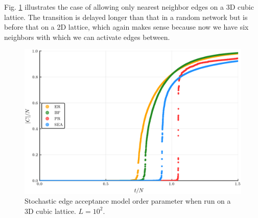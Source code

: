 Fig. \ref{fig:Lattice3D_ER_BF_PR_SEA_transition} illustrates the case of allowing only nearest neighbor edges on a 3D cubic lattice. The transition is delayed longer than that in a random network but is before that on a 2D lattice, which again makes sense because now we have six neighbors with which we can activate edges between.

\begin{figure}[H]
	\centering
	\includegraphics[width=350pt, clip]{images/Lattice3D_ER_BF_PR_SEA_1e6_order_param.png}
	\caption{Stochastic edge acceptance model order parameter when run on a 3D cubic lattice. $L = 10^2.$}
	\label{fig:Lattice3D_ER_BF_PR_SEA_transition}
\end{figure}
